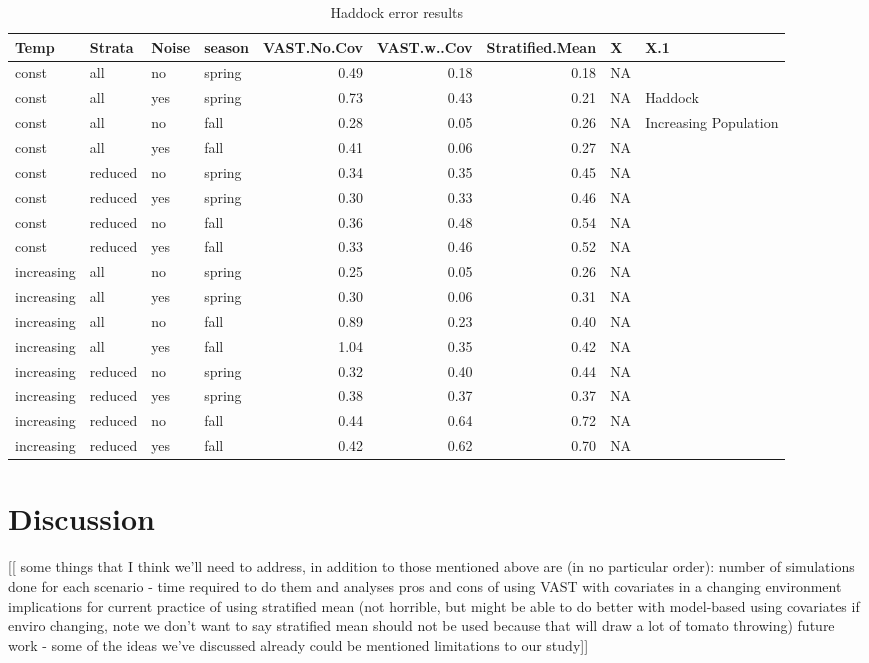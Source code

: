 \documentclass[
  12pt,
]{article}
\begin{document}
\begin{table}

\caption{\label{tab:unnamed-chunk-1}Haddock error results}
\centering
\begin{tabular}[t]{l|l|l|l|r|r|r|l|l}
\hline
Temp & Strata & Noise & season & VAST.No.Cov & VAST.w..Cov & Stratified.Mean & X & X.1\\
\hline
const & all & no & spring & 0.49 & 0.18 & 0.18 & NA & \\
\hline
const & all & yes & spring & 0.73 & 0.43 & 0.21 & NA & Haddock\\
\hline
const & all & no & fall & 0.28 & 0.05 & 0.26 & NA & Increasing Population\\
\hline
const & all & yes & fall & 0.41 & 0.06 & 0.27 & NA & \\
\hline
const & reduced & no & spring & 0.34 & 0.35 & 0.45 & NA & \\
\hline
const & reduced & yes & spring & 0.30 & 0.33 & 0.46 & NA & \\
\hline
const & reduced & no & fall & 0.36 & 0.48 & 0.54 & NA & \\
\hline
const & reduced & yes & fall & 0.33 & 0.46 & 0.52 & NA & \\
\hline
increasing & all & no & spring & 0.25 & 0.05 & 0.26 & NA & \\
\hline
increasing & all & yes & spring & 0.30 & 0.06 & 0.31 & NA & \\
\hline
increasing & all & no & fall & 0.89 & 0.23 & 0.40 & NA & \\
\hline
increasing & all & yes & fall & 1.04 & 0.35 & 0.42 & NA & \\
\hline
increasing & reduced & no & spring & 0.32 & 0.40 & 0.44 & NA & \\
\hline
increasing & reduced & yes & spring & 0.38 & 0.37 & 0.37 & NA & \\
\hline
increasing & reduced & no & fall & 0.44 & 0.64 & 0.72 & NA & \\
\hline
increasing & reduced & yes & fall & 0.42 & 0.62 & 0.70 & NA & \\
\hline
\end{tabular}
\end{table}

\section{Discussion}

{[}{[} some things that I think we'll need to address, in addition to those mentioned above are (in no particular order):
number of simulations done for each scenario - time required to do them and analyses
pros and cons of using VAST with covariates in a changing environment
implications for current practice of using stratified mean (not horrible, but might be able to do better with model-based using covariates if enviro changing, note we don't want to say stratified mean should not be used because that will draw a lot of tomato throwing)
future work - some of the ideas we've discussed already could be mentioned
limitations to our study{]}{]}
\end{document}
